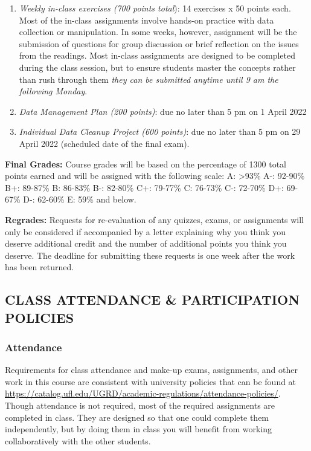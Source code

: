\documentclass[
  12pt,
]{article}
\begin{document}
\begin{enumerate}
\def\labelenumi{\arabic{enumi}.}
\item
  \emph{Weekly in-class exercises (700 points total}): 14 exercises x 50
  points each. Most of the in-class assignments involve hands-on
  practice with data collection or manipulation. In some weeks, however,
  assignment will be the submission of questions for group discussion or
  brief reflection on the issues from the readings. Most in-class
  assignments are designed to be completed during the class session, but
  to ensure students master the concepts rather than rush through them
  \emph{they can be submitted anytime until 9 am the following Monday}.
\item
  \emph{Data Management Plan (200 points)}: due no later than 5 pm on 1
  April 2022
\item
  \emph{Individual Data Cleanup Project (600 points)}: due no later than
  5 pm on 29 April 2022 (scheduled date of the final exam).
\end{enumerate}

\textbf{Final Grades:} Course grades will be based on the percentage of
1300 total points earned and will be assigned with the following scale:
A: \textgreater93\% A-: 92-90\% B+: 89-87\% B: 86-83\% B-: 82-80\% C+:
79-77\% C: 76-73\% C-: 72-70\% D+: 69-67\% D-: 62-60\% E: 59\% and
below.

\textbf{Regrades: } Requests for re-evaluation of any quizzes, exams, or
assignments will only be considered if accompanied by a letter
explaining why you think you deserve additional credit and the number of
additional points you think you deserve. The deadline for submitting
these requests is one week after the work has been returned.

\hypertarget{class-attendance-participation-policies}{%
\subsection{CLASS ATTENDANCE \& PARTICIPATION
POLICIES}\label{class-attendance-participation-policies}}

\hypertarget{attendance}{%
\subsubsection{\texorpdfstring{\textbf{Attendance}}{Attendance}}\label{attendance}}

Requirements for class attendance and make-up exams, assignments, and
other work in this course are consistent with university policies that
can be found at
\url{https://catalog.ufl.edu/UGRD/academic-regulations/attendance-policies/}.
Though attendance is not required, most of the required assignments are
completed in class. They are designed so that one could complete them
independently, but by doing them in class you will benefit from working
collaboratively with the other students.
\end{document}
